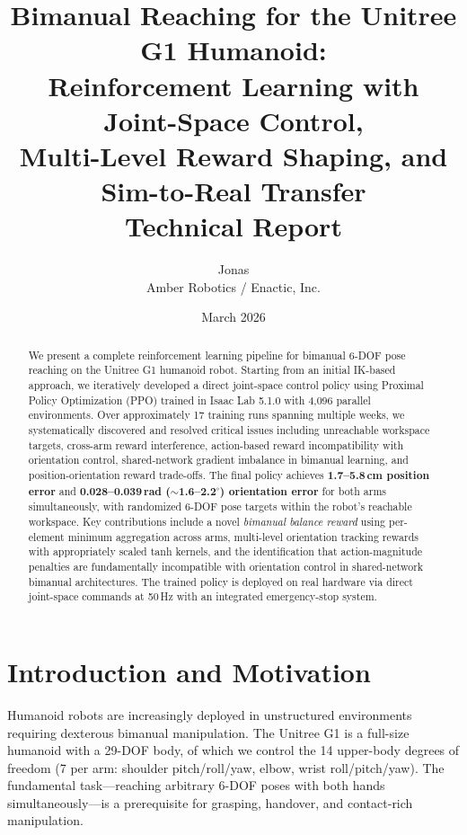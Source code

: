 \documentclass[11pt,a4paper]{article}
\title{
  \vspace{-1cm}
  \textbf{Bimanual Reaching for the Unitree G1 Humanoid:}\\[6pt]
  \large Reinforcement Learning with Joint-Space Control, \\
  Multi-Level Reward Shaping, and Sim-to-Real Transfer\\[12pt]
  \normalsize Technical Report
}
\author{
  Jonas\\
  Amber Robotics / Enactic, Inc.
}
\date{March 2026}
\begin{document}
\maketitle

\begin{abstract}
We present a complete reinforcement learning pipeline for bimanual 6-DOF pose reaching on the Unitree G1 humanoid robot. Starting from an initial IK-based approach, we iteratively developed a direct joint-space control policy using Proximal Policy Optimization (PPO) trained in Isaac Lab 5.1.0 with 4,096 parallel environments. Over approximately 17 training runs spanning multiple weeks, we systematically discovered and resolved critical issues including unreachable workspace targets, cross-arm reward interference, action-based reward incompatibility with orientation control, shared-network gradient imbalance in bimanual learning, and position-orientation reward trade-offs. The final policy achieves \textbf{1.7--5.8\,cm position error} and \textbf{0.028--0.039\,rad ($\sim$1.6--2.2$^\circ$) orientation error} for both arms simultaneously, with randomized 6-DOF pose targets within the robot's reachable workspace. Key contributions include a novel \emph{bimanual balance reward} using per-element minimum aggregation across arms, multi-level orientation tracking rewards with appropriately scaled tanh kernels, and the identification that action-magnitude penalties are fundamentally incompatible with orientation control in shared-network bimanual architectures. The trained policy is deployed on real hardware via direct joint-space commands at 50\,Hz with an integrated emergency-stop system.
\end{abstract}

\tableofcontents
\newpage

\section{Introduction and Motivation}
\label{sec:intro}

Humanoid robots are increasingly deployed in unstructured environments requiring dexterous bimanual manipulation. The Unitree G1 is a full-size humanoid with a 29-DOF body, of which we control the 14 upper-body degrees of freedom (7 per arm: shoulder pitch/roll/yaw, elbow, wrist roll/pitch/yaw). The fundamental task---reaching arbitrary 6-DOF poses with both hands simultaneously---is a prerequisite for grasping, handover, and contact-rich manipulation.
\end{document}

